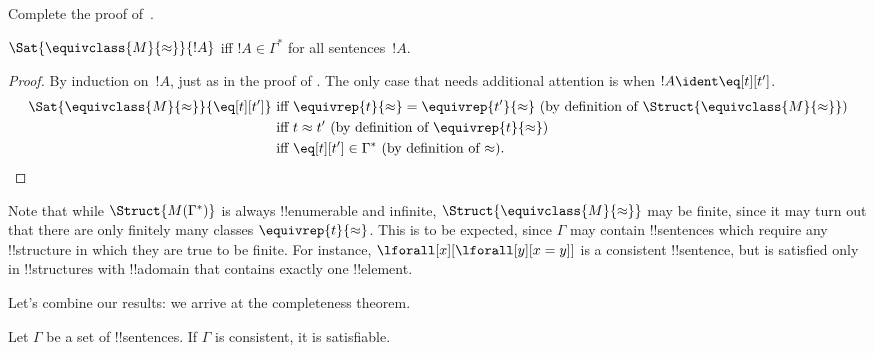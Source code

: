 \begin{prob}
Complete the proof of~.
\end{prob}

\begin{lem}
$\Sat{\equivclass{M}{\approx}}{!A}$ iff $!A \in \Gamma^*$ for all
  sentences~$!A$.
\end{lem}

\begin{proof}
By induction on~$!A$, just as in the proof of .
The only case that needs additional attention is when $!A \ident
\eq[t][t']$.
\begin{align*}
\Sat{\equivclass{M}{\approx}}{\eq[t][t']} & \text{ iff } \equivrep{t}{\approx} = \equivrep{t'}{\approx}
\text{ (by definition of $\Struct{\equivclass{M}{\approx}}$)}\\
& \text{ iff } t \approx t' \text{ (by definition of $\equivrep{t}{\approx}$)}\\
& \text{ iff } \eq[t][t'] \in \Gamma^* \text{ (by definition of $\approx$).}
\end{align*}
\end{proof}

\begin{digress}
Note that while $\Struct{M(\Gamma^*)}$ is always !!{enumerable} and
infinite, $\Struct{\equivclass{M}{\approx}}$ may be finite, since it
may turn out that there are only finitely many classes
$\equivrep{t}{\approx}$.  This is to be expected, since $\Gamma$ may
contain !!{sentence}s which require any !!{structure} in which they
are true to be finite.  For instance, $\lforall[x][\lforall[y][x =
y]]$ is a consistent !!{sentence}, but is satisfied only in
!!{structure}s with !!a{domain} that contains exactly one
!!{element}.
\end{digress}








\begin{explain}
Let's combine our results: we arrive at the completeness theorem.
\end{explain}

\begin{thm}
Let $\Gamma$ be a set of !!{sentence}s.  If $\Gamma$ is consistent, it
is satisfiable.
\end{thm}


